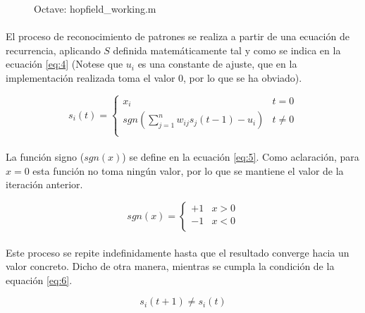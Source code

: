 \documentclass[10pt, a4paper,spanish]{article}
\begin{document}
		\begin{figure}[htpb!]
			\centering
			\inputminted{octave}{../src/hopfield_working.m}
			\caption{Octave: hopfield\_working.m}
			\label{code:working}
		\end{figure}

		\paragraph{}
		El proceso de reconocimiento de patrones se realiza a partir de una ecuación de recurrencia, aplicando $S$ definida matemáticamente tal y como se indica en la ecuación \ref{eq:4} (Notese que $u_{i}$ es una constante de ajuste, que en la implementación realizada toma el valor $0$, por lo que se ha obviado).

		\begin{equation} \label{eq:4}
		 	s_i(t) =
		 	\begin{cases}
      	x_i 																					& t = 0 		\\
      	sgn(\sum_{j=1}^{n} w_{ij}s_{j}(t-1) - u_{i}) 	& t \neq 0 	\\
   		\end{cases}
		\end{equation}

		\paragraph{}
		La función signo ($sgn(x)$) se define en la ecuación \ref{eq:5}. Como aclaración, para $x = 0$ esta función no toma ningún valor, por lo que se mantiene el valor de la iteración anterior.

		\begin{equation} \label{eq:5}
			sgn(x) =
			\begin{cases}
				+1 & x > 0 \\
				-1 & x < 0 \\
			\end{cases}
		\end{equation}

		\paragraph{}
		Este proceso se repite indefinidamente hasta que el resultado converge hacia un valor concreto. Dicho de otra manera, mientras se cumpla la condición de la equación \ref{eq:6}.

		\begin{equation} \label{eq:6}
			s_i(t+1) \neq s_i(t)
		\end{equation}
\end{document}
